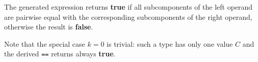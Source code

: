 
The generated expression returns \textbf{true} if all subcomponents of the left operand are pairwise equal with the corresponding subcomponents of the right operand, otherwise the result is  \textbf{false}.

Note that the special case $k=0$ is trivial: such a type has only one value $C$ and the derived \texttt{==} returns always \textbf{true}.

